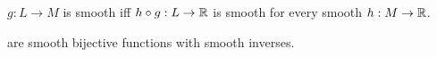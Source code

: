 \begin{corol}
$g:L\to M$ is smooth iff $h\circ g: L\to \mathbb{R}$ is smooth for every smooth $h:M\to \mathbb{R}$.
\end{corol}

\begin{ddef}[Diffeomorphims] 
are smooth bijective functions with smooth inverses.
\end{ddef}
